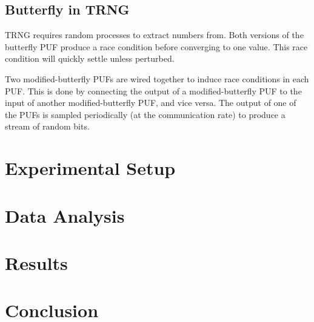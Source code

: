 	\subsection{Butterfly in TRNG}
		TRNG requires random processes to extract numbers from. Both versions of the butterfly PUF produce a race condition before converging to one value. This race condition will quickly settle unless perturbed. 

		Two modified-butterfly PUFs are wired together to induce race conditions in each PUF. This is done by connecting the output of a modified-butterfly PUF to the input of another modified-butterfly PUF, and vice versa. The output of one of the PUFs is sampled periodically (at the communication rate) to produce a stream of random bits. 
		
\section{Experimental Setup} \label{sec::expr}
	
	

\section{Data Analysis}\label{sec::analysis} 

\section{Results}\label{res}

\section{Conclusion}\label{sec::conclusion} 


\nocite{*}












